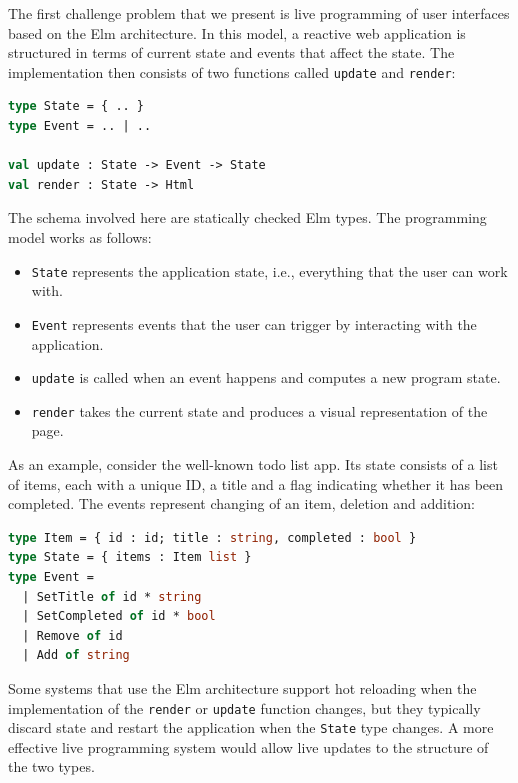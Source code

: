 \documentclass[english,submission]{programming}
\begin{document}
The first challenge problem that we present is live programming
of user interfaces based on the Elm architecture. In this model, a reactive web application is
structured in terms of current state and events that affect the state. The implementation then
consists of two functions called \texttt{update} and \texttt{render}:

\begin{lstlisting}[language=ml,morekeywords={on}]
type State = { .. }
type Event = .. | ..

val update : State -> Event -> State
val render : State -> Html
\end{lstlisting}

\noindent
The schema involved here are statically checked Elm types. The programming model works as follows:

\begin{itemize}
\setlength\itemsep{0em}
\item \texttt{State} represents the application state, i.e., everything that the user can work with.
\item \texttt{Event} represents events that the user can trigger by interacting with the application.
\item \texttt{update} is called when an event happens and computes a new program state.
\item \texttt{render} takes the current state and produces a visual representation of the page.
\end{itemize}

\noindent
As an example, consider the well-known todo list app. Its state consists of a list of items,
each with a unique ID, a title and a flag indicating whether it has been completed.
The events represent changing of an item, deletion and addition:

\begin{lstlisting}[language=ml]
type Item = { id : id; title : string, completed : bool }
type State = { items : Item list }
type Event =
  | SetTitle of id * string
  | SetCompleted of id * bool
  | Remove of id
  | Add of string
\end{lstlisting}

\noindent
Some systems that use the Elm architecture support hot reloading when the
implementation of the \texttt{render} or \texttt{update} function changes, but they typically
discard state and restart the application when the \texttt{State} type changes. A more effective
live programming system would allow live updates to the structure of the two types.
\end{document}
